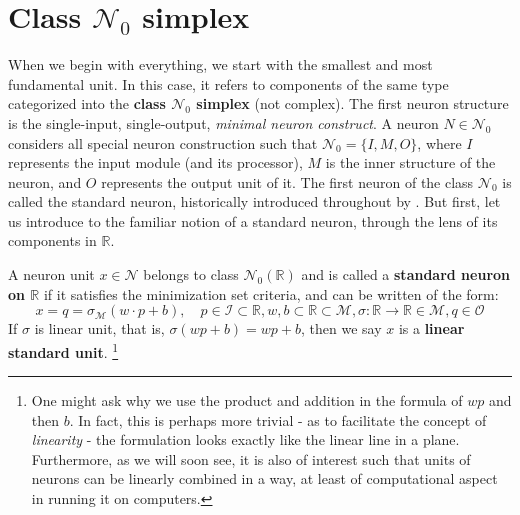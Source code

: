 \section{Class $\mathcal{N}_{0}$ simplex}
When we begin with everything, we start with the smallest and most fundamental unit. In this case, it refers to components of the same type categorized into the \textbf{class $\mathcal{N}_{0}$ simplex} (not complex). The first neuron structure is the single-input, single-output, \textit{minimal neuron construct}. A neuron $N\in \mathcal{N}_{0}$ considers all special neuron construction such that $\mathcal{N}_{0}=\{I,M,O\}$, where $I$ represents the input module (and its processor), $M$ is the inner structure of the neuron, and $O$ represents the output unit of it. The first neuron of the class $\mathcal{N}_{0}$ is called the standard neuron, historically introduced throughout by \cite{mcculloch_logical_1943,nakkiran_deep_2019,goodfellow2016deep}. But first, let us introduce to the familiar notion of a standard neuron, through the lens of its components in $\mathbb{R}$. 
\begin{definition}
    A neuron unit $x\in \mathcal{N}$ belongs to class $\mathcal{N}_{0}(\mathbb{R})$ and is called a \textbf{standard neuron on $\mathbb{R}$} if it satisfies the minimization set criteria, and can be written of the form: 
    \begin{equation}
        x = q = \sigma_{\mathcal{M}}(w\cdot p + b),\quad  p\in \mathcal{I}\subset \mathbb{R}, w,b \subset \mathbb{R}\subset \mathcal{M}, \sigma: \mathbb{R}\to \mathbb{R} \in \mathcal{M}, q \in \mathcal{O}
    \end{equation}
    If $\sigma$ is linear unit, that is, $\sigma(wp+b)=wp+b$, then we say $x$ is a \textbf{linear standard unit}. \footnote{One might ask why we use the product and addition in the formula of $wp$ and then $b$. In fact, this is perhaps more trivial - as to facilitate the concept of \textit{linearity} - the formulation looks exactly like the linear line in a plane. Furthermore, as we will soon see, it is also of interest such that units of neurons can be linearly combined in a way, at least of computational aspect in running it on computers.} 
\end{definition}

